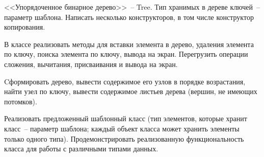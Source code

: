 
<<Упорядоченное бинарное дерево>>~-- Tree. Тип хранимых в дереве ключей~-- параметр
шаблона. Написать несколько конструкторов, в том числе конструктор копирования.

В
классе реализовать методы для вставки элемента в дерево, удаления элемента по ключу,
поиска элемента по ключу, вывода на экран. Перегрузить операции сложения, вычитания,
присваивания и вывода на экран.

Cформировать дерево, вывести содержимое его узлов в
порядке возрастания, найти узел по ключу, вывести содержимое листьев дерева (вершин,
не имеющих потомков).

Реализовать предложенный шаблонный класс (тип элементов, которые
хранит класс~-- параметр шаблона; каждый объект класса может хранить
элементы только одного типа). Продемонстрировать реализованную
функциональность класса для работы с различными типами данных.

